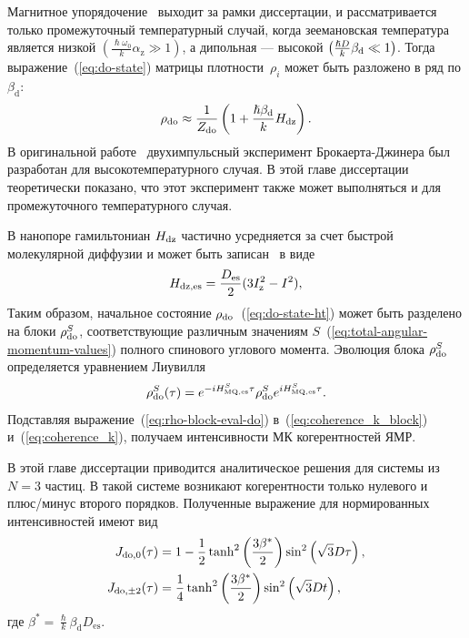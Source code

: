 Магнитное упорядочение~\cite{Abragam1982} выходит за рамки диссертации,
и рассматривается только промежуточный температурный случай,
когда зеемановская температура является низкой $({\frac{\hslash \omega_{0}}{k} \alpha_\mathrm{z}}\gg 1)$,
а дипольная --- высокой $\left(  \frac{\hslash{D}}{k}\beta_\mathrm{d} \ll 1 \right)$.
Тогда выражение~(\ref{eq:do-state}) матрицы плотности~$\rho_i$ может быть разложено в ряд по $\beta_\mathrm{d}$:
%
\begin{equation}\label{eq:do-state-ht}
  \rho_\mathrm{do} \approx \frac{1}{Z_\mathrm{do}}\left( 1 + \frac{\hslash\beta_\mathrm{d}}{k} H_\mathrm{dz} \right).
\end{equation}
%
В оригинальной работе~\cite{Jeener1967} двухимпульсный эксперимент Брокаерта-Джинера был разработан для высокотемпературного случая.
В этой главе диссертации теоретически показано,
что этот эксперимент также может выполняться и для промежуточного температурного случая.

В нанопоре гамильтониан $H_\mathrm{dz}$ частично усредняется за счет быстрой молекулярной диффузии
и может быть записан~\cite{Feldman2004,Doronin2011} в виде
%
\begin{equation}\label{eq:hdz-mean}
  H_\mathrm{dz, es} = \frac{D_\mathrm{es}}{2} (3 I_\mathrm{z}^2 - I^2),
\end{equation}
\hdzEquivaletnSpinsExplanatoryNote
%
Таким образом, начальное состояние $\rho_\mathrm{do}$~(\ref{eq:do-state-ht}) может быть разделено на блоки $\rho_\mathrm{do}^S$, соответствующие различным значениям $S$~(\ref{eq:total-angular-momentum-values}) полного спинового углового момента.
Эволюция блока $\rho_\mathrm{do}^S$ определяется уравнением Лиувилля
%
\begin{equation}\label{eq:rho-block-eval-do}
  \rho_\mathrm{do}^S(\tau) = e^{-i H_\mathrm{MQ,es}^S \tau}
    \rho_\mathrm{do}^S e^{i H_\mathrm{MQ,es}^S \tau}.
\end{equation}
%
Подставляя выражение~(\ref{eq:rho-block-eval-do})  в~(\ref{eq:coherence_k_block}) и~(\ref{eq:coherence_k}), получаем интенсивности МК когерентностей ЯМР.

В этой главе диссертации приводится аналитическое решения для системы из $N=3$ частиц.
В такой системе возникают когерентности только нулевого и плюс/минус второго порядков.
Полученные выражение для нормированных интенсивностей имеют вид
%
\begin{align}\label{eq:coherences-n3-do}
    J_{\mathrm{do}, 0}(\tau) & = 1
    - \dfrac 1 2 \tanh^2\left(  \dfrac{3 \beta^* }{2}  \right)
      \sin^2 \left(  \sqrt{3} D\tau  \right),
    \\
    J_{\mathrm{do},\pm2}(\tau) & = \dfrac{1}{4}
      \tanh^2 \left(  \dfrac{3 \beta^*}{2}  \right)
      \sin^2 \left(  \sqrt{3} Dt  \right),
\end{align}
где $\beta^* = {\frac{\hslash}{k} \beta_\mathrm{d} D_\mathrm{es}}$.


